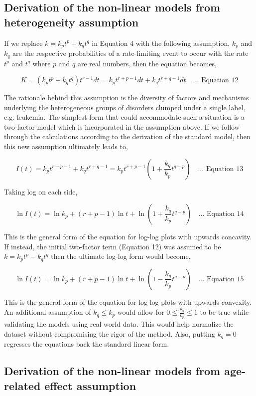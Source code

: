 \documentclass[lineno,sn-basic, Numbered]{sn-jnl}%
\theoremstyle{thmstyleone}%
\theoremstyle{thmstyletwo}%
\theoremstyle{thmstylethree}%
\begin{document}
\subsection{Derivation of the non-linear models from heterogeneity assumption}

If we replace \( k = k_p t^p + k_q t^q \) in Equation 4 with the following assumption, \( k_p \) and \( k_q \) are the respective probabilities of a rate-limiting event to occur with the rate \( t^p \) and \( t^q \) where \( p \) and \( q \) are real numbers, then the equation becomes,

\[ K = (k_p t^p + k_q t^q) t^{r-1} dt = k_p t^{r+p-1} dt + k_q t^{r+q-1} dt \quad \text{... Equation 12} \]

The rationale behind this assumption is the diversity of factors and mechanisms underlying the heterogeneous groups of disorders clumped under a single label, e.g. leukemia. The simplest form that could accommodate such a situation is a two-factor model \cite{knudson1981mutation} \cite{moolgavkar1979twoevent} which is incorporated in the assumption above. If we follow through the calculations according to the derivation of the standard model, then this new assumption ultimately leads to,

\[ I(t) = k_p t^{r+p-1} + k_q t^{r+q-1} = k_p t^{r+p-1} \left( 1 + \frac{k_q}{k_p} t^{q-p} \right) \quad \text{... Equation 13} \]

Taking log on each side,

\[ \ln I(t) = \ln k_p + (r + p - 1) \ln t + \ln \left( 1 + \frac{k_q}{k_p} t^{q-p} \right) \quad \text{... Equation 14} \]

This is the general form of the equation for log-log plots with upwards concavity. If instead, the initial two-factor term (Equation 12) was assumed to be \( k = k_p t^p - k_q t^q \) then the ultimate log-log form would become,

\[ \ln I(t) = \ln k_p + (r + p - 1) \ln t + \ln \left( 1 - \frac{k_q}{k_p} t^{q-p} \right) \quad \text{... Equation 15} \]

This is the general form of the equation for log-log plots with upwards convexity. An additional assumption of \( k_q \leq k_p \) would allow for \( 0 \leq \frac{k_q}{k_p} \leq 1 \) to be true while validating the models using real world data. This would help normalize the dataset without compromising the rigor of the method. Also, putting \( k_q = 0 \) regresses the equations back the standard linear form.

\subsection{Derivation of the non-linear models from age-related effect assumption}
\end{document}
